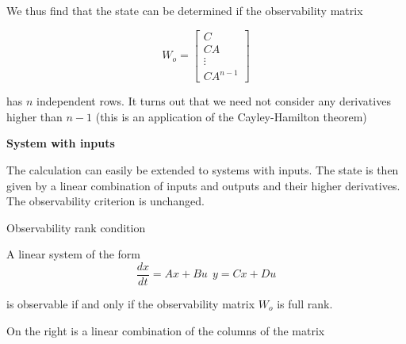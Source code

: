 We thus find that the state can  be  determined if the observability matrix
 
\begin{equation}
W_o= 
\begin{bmatrix}
 C \\
 CA \\
 \vdots \\
 CA^{n-1} 
\end{bmatrix}
\end{equation}

has $n$ independent rows.  It turns out  that  we  need  not consider any derivatives higher
than $n-1$ (this is an application of the Cayley-Hamilton theorem)
 
\begin{framed}
\theoremstyle{remark}
\begin{remark}{\textbf{System with inputs}}

The calculation can easily be extended to systems with inputs. The state is then
given by a linear combination of inputs and outputs and their higher derivatives.
The observability criterion is unchanged. 
\end{remark}
\end{framed}


\begin{framed}
\theoremstyle{theorem}
\begin{theorem}{Observability rank condition}

A linear system of the form  
\begin{equation}
\frac{dx}{dt} = Ax + Bu ~~ y = Cx + Du \nonumber
\end{equation}

is observable if and only if the observability matrix $W_o$ is full rank.

\end{theorem}
\end{framed}






























On the right is a linear combination of the columns of the matrix



